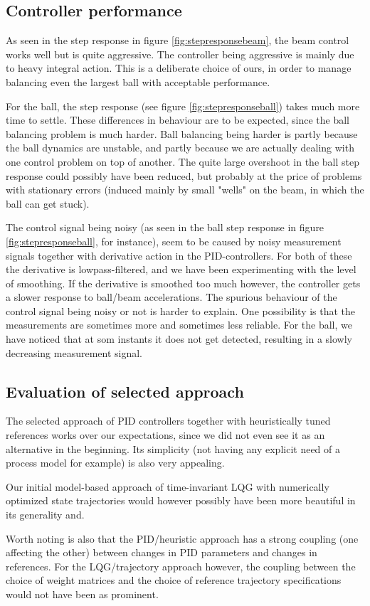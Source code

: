
\subsection{Controller performance}
As seen in the step response in figure \ref{fig:stepresponsebeam}, the beam control works well but is quite aggressive.
The controller being aggressive is mainly due to heavy integral action.
This is a deliberate choice of ours, in order to manage balancing even the largest ball with acceptable performance.

For the ball, the step response (see figure \ref{fig:stepresponseball}) takes much more time to settle.
These differences in behaviour are to be expected, since the ball balancing problem is much harder.
Ball balancing being harder is partly because the ball dynamics are unstable, and partly because we are actually dealing with one control problem on top of another.
The quite large overshoot in the ball step response could possibly have been reduced, but probably at the price of problems with stationary errors (induced mainly by small "wells" on the beam, in which the ball can get stuck).

The control signal being noisy (as seen in the ball step response in figure \ref{fig:stepresponseball}, for instance), seem to be caused by noisy measurement signals together with derivative action in the PID-controllers.
For both of these the derivative is lowpass-filtered, and we have been experimenting with the level of smoothing. If the derivative is smoothed too much however, the controller gets a slower response to ball/beam accelerations.
The spurious behaviour of the control signal being noisy or not is harder to explain.
One possibility is that the measurements are sometimes more and sometimes less reliable.
For the ball, we have noticed that at som instants it does not get detected, resulting in a slowly decreasing measurement signal.

\subsection{Evaluation of selected approach}
The selected approach of PID controllers together with heuristically tuned references works over our expectations, since we did not even see it as an alternative in the beginning. Its simplicity (not having any explicit need of a process model for example) is also very appealing.

Our initial model-based approach of time-invariant LQG with numerically optimized state trajectories would however possibly have been more beautiful in its generality and.

Worth noting is also that the PID/heuristic approach has a strong coupling (one affecting the other) between changes in PID parameters and changes in references. For the LQG/trajectory approach however, the coupling between the choice of weight matrices and the choice of reference trajectory specifications would not have been as prominent.

